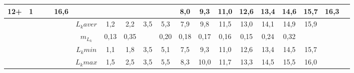 \begin{landscape}
\begin{table}[h]
\begin{tabular}{|c|c|cc|cc|ccccccccccccc|}
12+     & 1 &       &       & 16,6    &         &      &      &     &      & 8,0  & 9,3  & 11,0 & 12,6 & 13,4 & 14,6 & 15,7 & 16,3 &  \\ \hline
        &   &       &       &         & $L_k aver$ & 1,2  & 2,2  & 3,5 & 5,3  & 7,9  & 9,8  & 11,5 & 13,0 & 14,1 & 14,9 & 15,9 &      &  \\
        &   &       &       &         & $m_{L_k}$  & 0,13 & 0,35 &     & 0,20 & 0,18 & 0,17 & 0,16 & 0,15 & 0,24 & 0,32 &      &      &  \\
        &   &       &       &         & $L_k min$  & 1,1  & 1,8  & 3,5 & 5,1  & 7,5  & 9,3  & 11,0 & 12,6 & 13,4 & 14,5 & 15,7 &      &  \\
        &   &       &       &         & $L_k max$  & 1,5  & 2,5  & 3,5 & 5,5  & 8,3  & 10,0 & 11,7 & 13,3 & 14,5 & 15,5 & 16,0 &      &  \\ \hline
\end{tabular}
\end{table}


\end{landscape}
